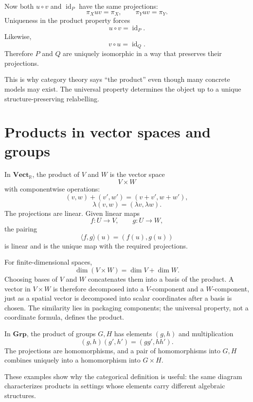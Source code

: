 Now both \(u\circ v\) and \(\operatorname{id}_P\) have the same projections:
\[
  \pi_Xuv=\pi_X,
  \qquad
  \pi_Yuv=\pi_Y.
\]
Uniqueness in the product property forces
\[
  u\circ v=\operatorname{id}_P.
\]
Likewise,
\[
  v\circ u=\operatorname{id}_Q.
\]
Therefore \(P\) and \(Q\) are uniquely isomorphic in a way that preserves their projections.

This is why category theory says ``the product'' even though many concrete models may exist.  The universal property determines the object up to a unique structure-preserving relabelling.

\section{Products in vector spaces and groups}

In \(\mathbf{Vect}_{\mathbb R}\), the product of \(V\) and \(W\) is the vector space
\[
  V\times W
\]
with componentwise operations:
\[
  (v,w)+(v',w')=(v+v',w+w'),
\]
\[
  \lambda(v,w)=(\lambda v,\lambda w).
\]
The projections are linear.  Given linear maps
\[
  f:U\to V,
  \qquad
  g:U\to W,
\]
the pairing
\[
  \langle f,g\rangle(u)=(f(u),g(u))
\]
is linear and is the unique map with the required projections.

For finite-dimensional spaces,
\[
  \dim(V\times W)=\dim V+\dim W.
\]
Choosing bases of \(V\) and \(W\) concatenates them into a basis of the product.  A vector in \(V\times W\) is therefore decomposed into a \(V\)-component and a \(W\)-component, just as a spatial vector is decomposed into scalar coordinates after a basis is chosen.  The similarity lies in packaging components; the universal property, not a coordinate formula, defines the product.

In \(\mathbf{Grp}\), the product of groups \(G,H\) has elements \((g,h)\) and multiplication
\[
  (g,h)(g',h')=(gg',hh').
\]
The projections are homomorphisms, and a pair of homomorphisms into \(G,H\) combines uniquely into a homomorphism into \(G\times H\).

These examples show why the categorical definition is useful: the same diagram characterizes products in settings whose elements carry different algebraic structures.

